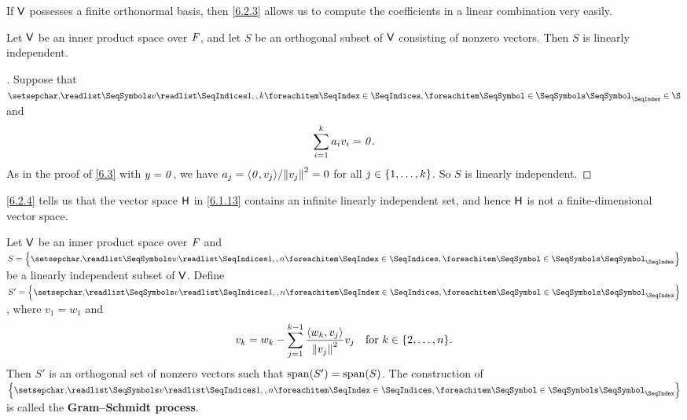\begin{note}
  If \(\mathsf{V}\) possesses a finite orthonormal basis, then \cref{6.2.3} allows us to compute the coefficients in a linear combination very easily.
\end{note}

\begin{cor}\label{6.2.4}
  Let \(\mathsf{V}\) be an inner product space over \(\mathit{F}\), and let \(S\) be an orthogonal subset of \(\mathsf{V}\) consisting of nonzero vectors.
  Then \(S\) is linearly independent.
\end{cor}

\begin{proof}[]
  Suppose that \(\seq{v}{1,,k} \in \S\) and
  \[
    \sum_{i = 1}^k a_i v_i = \mathit{0}.
  \]
  As in the proof of \cref{6.3} with \(y = \mathit{0}\), we have \(a_j = \inn{\zv, v_j} / \norm{v_j}^2 = 0\) for all \(j \in \left\lbrace1, \dots, k\right\rbrace\).
  So \(S\) is linearly independent.
\end{proof}

\begin{note}
  \cref{6.2.4} tells us that the vector space \(\mathsf{H}\) in \cref{6.1.13} contains an infinite linearly independent set, and hence \(\mathsf{H}\) is not a finite-dimensional vector space.
\end{note}

\begin{thm}\label{6.4}
  Let \(\mathsf{V}\) be an inner product space over \(\mathit{F}\) and \(S = \set{\seq{w}{1,,n}}\) be a linearly independent subset of \(\mathsf{V}\).
  Define \(S' = \set{\seq{v}{1,,n}}\), where \(v_1 = w_1\) and
  \begin{equation}\label{eq:6.2.1}
    v_k = w_k - \sum_{j = 1}^{k - 1} \frac{\inn{w_k, v_j}}{\norm{v_j}^2} v_j \quad \text{for } k \in \set{2, \dots, n}.
  \end{equation}
  Then \(S'\) is an orthogonal set of nonzero vectors such that \(\spn{S'} = \spn{S}\).
  The construction of \(\set{\seq{v}{1,,n}}\) is called the \textbf{Gram--Schmidt process}.
\end{thm}


